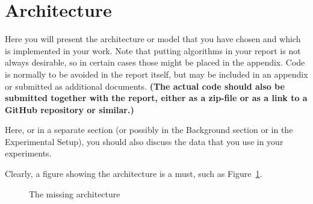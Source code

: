\section{Architecture}
\label{sec:architecture}

Here you will present the architecture or model that you have chosen and which is implemented in your work. 
Note that putting algorithms in your report is not always desirable, so in certain cases those might be placed in the appendix. 
Code is normally to be avoided in the report itself, but may be included in an appendix or submitted as additional documents. 
\textbf{(The actual code should also be submitted together with the report, either as a zip-file or as a link to a GitHub repository or similar.)}

Here, or in a separate section (or possibly in the Background section or in the Experimental Setup),
you should also discuss the data that you use in your experiments.

Clearly, a figure showing the architecture is a must, such as Figure~\ref{fig:Architecture}.

\begin{figure}[t!]
\centering
{}
\caption{The missing architecture}
\label{fig:Architecture}
\end{figure}

